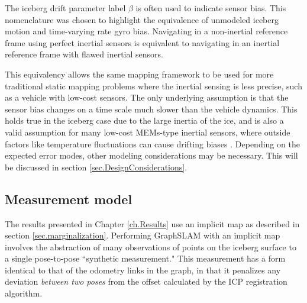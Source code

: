 The iceberg drift parameter label $\beta$ is often used to indicate sensor bias. This nomenclature was chosen to highlight the equivalence of unmodeled iceberg motion and time-varying rate gyro bias. Navigating in a non-inertial reference frame using perfect inertial sensors is equivalent to navigating in an inertial reference frame with flawed inertial sensors. 

This equivalency allows the same mapping framework to be used for more traditional static mapping problems where the inertial sensing is less precise, such as a vehicle with low-cost sensors. The only underlying assumption is that the sensor bias changes on a time scale much slower than the vehicle dynamics. This holds true in the iceberg case due to the large inertia of the ice, and is also a valid assumption for many low-cost MEMs-type inertial sensors, where outside factors like temperature fluctuations can cause drifting biases \cite{Keymeulen2005}. Depending on the expected error modes, other modeling considerations may be necessary. This will be discussed in section \ref{sec.DesignConsiderations}.


\subsection{Measurement model}

The results presented in Chapter \ref{ch.Results} use an implicit map as described in section \ref{sec.marginalization}. Performing GraphSLAM with an implicit map involves the abstraction of many observations of points on the iceberg surface to a single pose-to-pose ``synthetic measurement." This measurement has a form identical to that of the odometry links in the graph, in that it penalizes any deviation \emph{between two poses} from the offset calculated by the ICP registration algorithm.  


